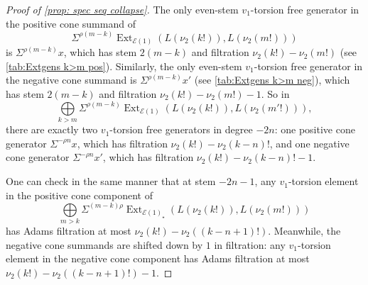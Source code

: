 \documentclass{amsart}
\theoremstyle{plain}
\numberwithin{equation}{section}
\numberwithin{figure}{section}
\DeclareMathOperator{\Ext}{Ext}
\newcommand{\cE}{{\mathcal E}}
\newcommand{\0}{\langle 0 \rangle }
\begin{document}
\begin{proof}[Proof of \cref{prop: spec seq collapse}]
The only even-stem $v_1$-torsion free generator in the positive cone summand of 
\[
\Sigma^{\rho(m-k)}\Ext_{\cE(1)}( L(\nu_{2}(k!) ), L(\nu_{2}(m!) ) )
\]
is $\Sigma^{\rho(m - k)} x$, which has stem $2(m-k)$ and filtration $\nu_{2}(k!) - \nu_{2}(m!)$ (see \cref{tab:Extgens k>m pos}). Similarly, the only even-stem $v_1$-torsion free generator in the negative cone summand is $\Sigma^{\rho(m - k)} x'$ (see \cref{tab:Extgens k>m neg}), which has stem $2(m-k)$ and filtration $\nu_{2}(k!) - \nu_{2}(m!) - 1$. So in \[
\bigoplus\limits_{k > m}\Sigma^{\rho(m-k)}\Ext_{\cE(1)}( L(\nu_{2}(k!) ), L(\nu_{2}(m'!) ) ),\]
there are exactly two $v_{1}$-torsion free generators in degree $-2n$: one positive cone generator $\Sigma^{-\rho n}x$, which has filtration $\nu_{2}(k!) - \nu_{2}(k-n)!$, and one negative cone generator $\Sigma^{-\rho n}x'$, which has filtration $\nu_{2}(k!) - \nu_{2}(k-n)!-1$.

One can check in the same manner that at stem $-2n-1$, any $v_{1}$-torsion element in the positive cone component of 
\[
\bigoplus\limits_{m>k}\Sigma^{(m-k)\rho}\Ext_{\cE(1)_{\star}}\left(L(\nu_{2}(k!)), L(\nu_{2}(m!)) \right)
\]
has Adams filtration at most $\nu_{2}(k!) - \nu_{2}\left((k-n+1)! \right)$. Meanwhile, the negative cone summands are shifted down by $1$ in filtration: any $v_{1}$-torsion element in the negative cone component has Adams filtration at most $\nu_{2}(k!) - \nu_{2}\left((k-n+1)! \right)-1$. 

\end{proof}
\end{document}
